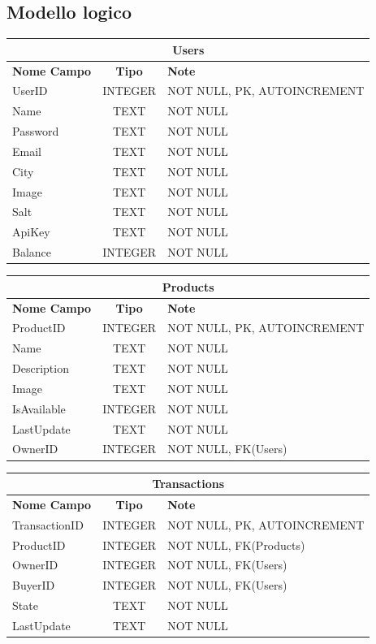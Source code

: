 \subsection{Modello logico}
\begin{center}
    \begin{tabular}{ |l|c|l| } 
    \hline
    \multicolumn{3}{|c|}{\large\textbf{Users}} \\
    \hline
    \textbf{Nome Campo} & \textbf{Tipo} & \textbf{Note} \\
    \hline
    UserID & INTEGER & NOT NULL, PK, AUTOINCREMENT \\
    Name & TEXT & NOT NULL \\
    Password & TEXT & NOT NULL \\
    Email & TEXT & NOT NULL \\
    City & TEXT & NOT NULL \\
    Image & TEXT & NOT NULL \\
    Salt & TEXT & NOT NULL \\
    ApiKey & TEXT & NOT NULL \\
    Balance & INTEGER & NOT NULL \\
    \hline
    \end{tabular}
\end{center}
\begin{center}
    \begin{tabular}{ |l|c|l| } 
    \hline
    \multicolumn{3}{|c|}{\large\textbf{Products}} \\
    \hline
    \textbf{Nome Campo} & \textbf{Tipo} & \textbf{Note} \\
    \hline
    ProductID & INTEGER & NOT NULL, PK, AUTOINCREMENT \\
    Name & TEXT & NOT NULL \\
    Description & TEXT & NOT NULL \\
    Image & TEXT & NOT NULL \\
    IsAvailable & INTEGER & NOT NULL \\
    LastUpdate & TEXT & NOT NULL \\
    OwnerID & INTEGER & NOT NULL, FK(Users) \\
    \hline
    \end{tabular}
\end{center}
\begin{center}
    \begin{tabular}{ |l|c|l| } 
    \hline
    \multicolumn{3}{|c|}{\large\textbf{Transactions}} \\
    \hline
    \textbf{Nome Campo} & \textbf{Tipo} & \textbf{Note} \\
    \hline
    TransactionID & INTEGER & NOT NULL, PK, AUTOINCREMENT \\
    ProductID & INTEGER & NOT NULL, FK(Products) \\
    OwnerID & INTEGER & NOT NULL, FK(Users) \\
    BuyerID & INTEGER & NOT NULL, FK(Users) \\
    State & TEXT & NOT NULL \\
    LastUpdate & TEXT & NOT NULL \\
    \hline
    \end{tabular}
\end{center}

